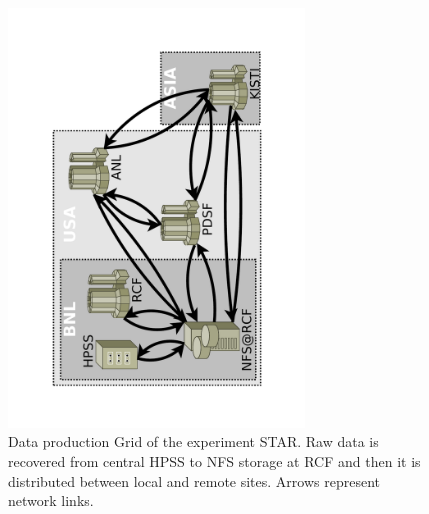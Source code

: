 \documentclass[english]{ddny}
\begin{document}
\begin{figure}[h]
	\begin{center}
		\includegraphics [trim= 30mm 30mm 30mm 30mm , clip, angle =-90, width=0.7\textwidth]{pic/sites.pdf}
	\end{center}
	\caption{Data production Grid of the experiment STAR. Raw data is recovered from central HPSS to NFS storage at RCF and then it is distributed between local and remote sites. Arrows represent network links.}
	\label{sites}
\end{figure} 	
\end{document}

